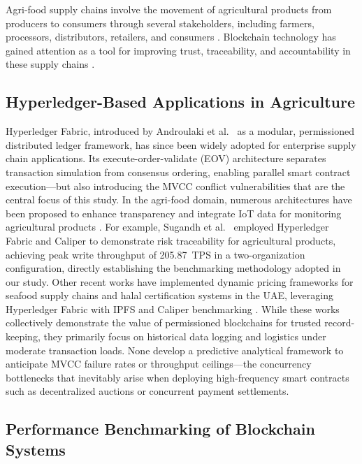 \documentclass[manuscript,screen]{acmart}
\begin{document}
Agri-food supply chains involve the movement of agricultural products from producers to consumers through several stakeholders, including farmers, processors, distributors, retailers, and consumers \citep{weerabahu_challenges_2022,nayal_antecedents_2021}. Blockchain technology has gained attention as a tool for improving trust, traceability, and accountability in these supply chains \citep{zhao_blockchain_2019,shahid_blockchain-based_2020}.

\subsection{Hyperledger-Based Applications in Agriculture}

Hyperledger Fabric, introduced by Androulaki et al.~\citep{androulaki_hyperledger_2018} as a modular, permissioned distributed ledger framework, has since been widely adopted for enterprise supply chain applications. Its execute-order-validate (EOV) architecture separates transaction simulation from consensus ordering, enabling parallel smart contract execution---but also introducing the MVCC conflict vulnerabilities that are the central focus of this study. In the agri-food domain, numerous architectures have been proposed to enhance transparency and integrate IoT data for monitoring agricultural products \citep{marchese_blockchain-based_2022,zhang_information_2022,iftekhar_blockchain-based_2021,joo_evidence_2021}. For example, Sugandh et al.~\citep{sugandh_approach_2023} employed Hyperledger Fabric and Caliper to demonstrate risk traceability for agricultural products, achieving peak write throughput of 205.87~TPS in a two-organization configuration, directly establishing the benchmarking methodology adopted in our study. Other recent works have implemented dynamic pricing frameworks for seafood supply chains and halal certification systems in the UAE, leveraging Hyperledger Fabric with IPFS and Caliper benchmarking \citep{rani_stp_2025,talib_blockchain-enabled_2026,keo_secure_2025}. While these works collectively demonstrate the value of permissioned blockchains for trusted record-keeping, they primarily focus on historical data logging and logistics under moderate transaction loads. None develop a predictive analytical framework to anticipate MVCC failure rates or throughput ceilings---the concurrency bottlenecks that inevitably arise when deploying high-frequency smart contracts such as decentralized auctions or concurrent payment settlements.

\subsection{Performance Benchmarking of Blockchain Systems}
\end{document}
